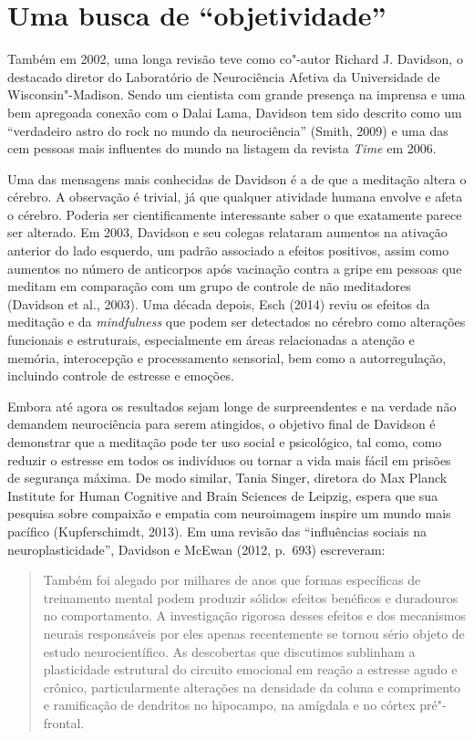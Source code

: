 \chapter{Uma busca de ``objetividade''}

Também em 2002, uma longa revisão teve como co"-autor Richard J.
Davidson, o destacado diretor do Laboratório de Neurociência Afetiva da
Universidade de Wisconsin"-Madison. Sendo um cientista com grande
presença na imprensa e uma bem apregoada conexão com o Dalai Lama,
Davidson tem sido descrito como um ``verdadeiro astro do rock no mundo
da neurociência'' (Smith, 2009) e uma das cem pessoas mais influentes do
mundo na listagem da revista \emph{Time} em 2006.

Uma das mensagens mais conhecidas de Davidson é a de que a meditação
altera o cérebro. A observação é trivial, já que qualquer atividade
humana envolve e afeta o cérebro. Poderia ser cientificamente
interessante saber o que exatamente parece ser alterado. Em 2003,
Davidson e seu colegas relataram aumentos na ativação anterior do lado
esquerdo, um padrão associado a efeitos positivos, assim como aumentos
no número de anticorpos após vacinação contra a gripe em pessoas que
meditam em comparação com um grupo de controle de não meditadores
(Davidson et al., 2003). Uma década depois, Esch (2014) reviu os efeitos
da meditação e da \emph{mindfulness} que podem ser detectados no cérebro
como alterações funcionais e estruturais, especialmente em áreas
relacionadas a atenção e memória, interocepção e processamento
sensorial, bem como a autorregulação, incluindo controle de estresse e
emoções.

Embora até agora os resultados sejam longe de surpreendentes e na
verdade não demandem neurociência para serem atingidos, o objetivo final
de Davidson é demonstrar que a meditação pode ter uso social e
psicológico, tal como, como reduzir o estresse em todos os indivíduos ou
tornar a vida mais fácil em prisões de segurança máxima. De modo
similar, Tania Singer, diretora do Max Planck Institute for Human
Cognitive and Brain Sciences de Leipzig, espera que sua pesquisa sobre
compaixão e empatia com neuroimagem inspire um mundo mais pacífico
(Kupferschimdt, 2013). Em uma revisão das ``influências sociais na
neuroplasticidade'', Davidson e McEwan (2012, p.~693) escreveram:

\begin{quote}
Também foi alegado por milhares de anos que formas específicas de
treinamento mental podem produzir sólidos efeitos benéficos e duradouros
no comportamento. A investigação rigorosa desses efeitos e dos
mecanismos neurais responsáveis por eles apenas recentemente se tornou
sério objeto de estudo neurocientífico. As descobertas que discutimos
sublinham a plasticidade estrutural do circuito emocional em reação a
estresse agudo e crônico, particularmente alterações na densidade da
coluna e comprimento e ramificação de dendritos no hipocampo, na
amígdala e no córtex pré"-frontal.
\end{quote}

